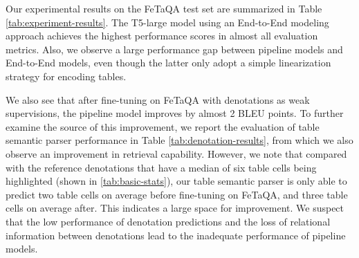 \documentclass[11pt,a4paper]{article}
\newcommand{\ours}{FeTaQA\xspace}
\begin{document}
Our experimental results on the \ours test set are summarized in Table \ref{tab:experiment-results}. The T5-large model using an End-to-End modeling approach achieves the highest performance scores in almost all evaluation metrics. Also, we observe a large performance gap between pipeline models and End-to-End models, even though the latter only adopt a simple linearization strategy for encoding tables.

We also see that after fine-tuning on \ours with denotations as weak supervisions, the pipeline model improves by almost 2 BLEU points. To further examine the source of this improvement, we report the evaluation of table semantic parser performance in Table \ref{tab:denotation-results}, from which we also observe an improvement in retrieval capability. However, we note that compared with the reference denotations that have a median of six table cells being highlighted (shown in \ref{tab:basic-stats}), our table semantic parser is only able to predict two table cells on average before fine-tuning on \ours, and three table cells on average after. This indicates a large space for improvement. We suspect that the low performance of denotation predictions and the loss of relational information between denotations lead to the inadequate performance of pipeline models.

\begin{table}[]
\centering
{}
\caption{Evaluation of denotation prediction on the test split of \ours. We report performance of TAPAS in zero-shot and fine-tuned with weak supervision.}
\label{tab:denotation-results}
\end{table}
\end{document}
